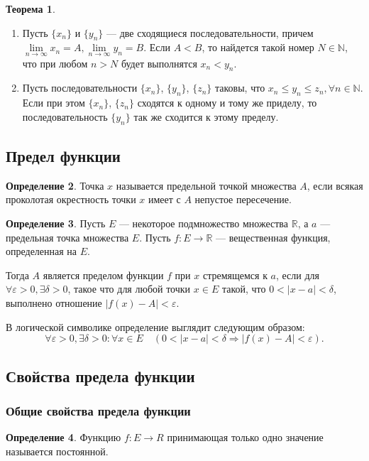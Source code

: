 \documentclass[12pt]{report}
\theoremstyle{definition}
\newtheorem{theorem}{Теорема}[chapter]
\newtheorem{definition}[theorem]{Определение}
\newcommand{\R}{\mathbb R}
\newcommand{\N}{\mathbb N}
\begin{document}
\begin{theorem}
\begin{enumerate}
  \item Пусть $\{x_n\}$ и $\{y_n\}$ --- две сходящиеся последовательности, причем
    $\lim\limits_{n\rightarrow\infty} x_n = A, \lim\limits_{n\rightarrow\infty} y_n = B.$
    Если $A < B$, то найдется такой номер $N \in \N$, что при любом $n > N$ будет выполнятся
    $x_n < y_n$.
  \item Пусть последовательности $\{x_n\}$, $\{y_n\}$, $\{z_n\}$ таковы, что $x_n \le y_n \le z_n, \forall n \in \N$.
    Если при этом $\{x_n\}$, $\{z_n\}$ сходятся к одному и тому же приделу, то последовательность
    $\{y_n\}$ так же сходится к этому пределу.
\end{enumerate}
\end{theorem}

\subsection{Предел функции}
\begin{definition}
Точка $x$ называется предельной точкой множества $A$, если всякая проколотая окрестность точки
$x$ имеет с $A$ непустое пересечение.
\end{definition}

\begin{definition}
Пусть $E$ --- некоторое подмножество множества $\R$, а $a$ --- предельная точка множества
$E$. Пусть $f: E \rightarrow \R$ --- вещественная функция, определенная на $E$.


Тогда $A$ является пределом функции $f$ при $x$ стремящемся к $a$, если для
$\forall \varepsilon > 0, \exists \delta > 0$, такое что для любой точки 
$x \in E$ такой, что $ 0 < |x - a| < \delta$, выполнено отношение $|f(x) - A| < \varepsilon$.
\end{definition}

В логической символике определение выглядит следующим образом:
$$
\forall \varepsilon > 0, \exists \delta > 0: \forall x \in E \quad (0 < |x - a| < \delta \Rightarrow |f(x) - A| < \varepsilon).
$$

\subsection{Свойства предела функции}
\subsubsection{Общие свойства предела функции}
\begin{definition}
  Функцию $f: E \rightarrow R$ принимающая только одно значение называется постоянной.
\end{definition}
\end{document}
